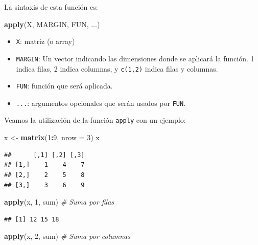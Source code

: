 \documentclass[
]{book}
\newenvironment{Shaded}{\begin{snugshade}}{\end{snugshade}}
\newcommand{\AttributeTok}[1]{\textcolor[rgb]{0.13,0.29,0.53}{#1}}
\newcommand{\CommentTok}[1]{\textcolor[rgb]{0.56,0.35,0.01}{\textit{#1}}}
\newcommand{\DecValTok}[1]{\textcolor[rgb]{0.00,0.00,0.81}{#1}}
\newcommand{\FunctionTok}[1]{\textcolor[rgb]{0.13,0.29,0.53}{\textbf{#1}}}
\newcommand{\NormalTok}[1]{#1}
\newcommand{\OtherTok}[1]{\textcolor[rgb]{0.56,0.35,0.01}{#1}}
\newcommand{\SpecialCharTok}[1]{\textcolor[rgb]{0.81,0.36,0.00}{\textbf{#1}}}
\providecommand{\tightlist}{%
  \setlength{\itemsep}{0pt}\setlength{\parskip}{0pt}}
\begin{document}
La sintaxis de esta función es:

\begin{Shaded}
\begin{Highlighting}[]
\FunctionTok{apply}\NormalTok{(X, MARGIN, FUN, ...)}
\end{Highlighting}
\end{Shaded}

\begin{itemize}
\tightlist
\item
  \texttt{X}: matriz (o array)
\item
  \texttt{MARGIN}: Un vector indicando las dimensiones donde se aplicará
  la función. 1 indica filas, 2 indica columnas, y \texttt{c(1,2)} indica
  filas y columnas.
\item
  \texttt{FUN}: función que será aplicada.
\item
  \texttt{...}: argumentos opcionales que serán usados por \texttt{FUN}.
\end{itemize}

Veamos la utilización de la función \texttt{apply} con un ejemplo:

\begin{Shaded}
\begin{Highlighting}[]
\NormalTok{x }\OtherTok{\textless{}{-}} \FunctionTok{matrix}\NormalTok{(}\DecValTok{1}\SpecialCharTok{:}\DecValTok{9}\NormalTok{, }\AttributeTok{nrow =} \DecValTok{3}\NormalTok{)}
\NormalTok{x}
\end{Highlighting}
\end{Shaded}

\begin{verbatim}
##      [,1] [,2] [,3]
## [1,]    1    4    7
## [2,]    2    5    8
## [3,]    3    6    9
\end{verbatim}

\begin{Shaded}
\begin{Highlighting}[]
\FunctionTok{apply}\NormalTok{(x, }\DecValTok{1}\NormalTok{, sum)    }\CommentTok{\# Suma por filas}
\end{Highlighting}
\end{Shaded}

\begin{verbatim}
## [1] 12 15 18
\end{verbatim}

\begin{Shaded}
\begin{Highlighting}[]
\FunctionTok{apply}\NormalTok{(x, }\DecValTok{2}\NormalTok{, sum)    }\CommentTok{\# Suma por columnas}
\end{Highlighting}
\end{Shaded}
\end{document}
